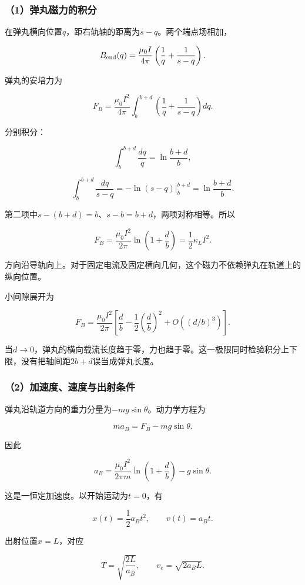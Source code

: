 \documentclass[12pt,a4paper,fontset=fandol]{ctexart}
\begin{document}
\subsubsection{（1）弹丸磁力的积分}\label{ux5f39ux4e38ux78c1ux529bux7684ux79efux5206}

在弹丸横向位置\(q\)，距右轨轴的距离为\(s-q\)。两个端点场相加，

\[
B_{\rm end}(q)=\frac{\mu_0I}{4\pi}
\left(\frac1q+\frac1{s-q}\right).
\]

弹丸的安培力为

\[
F_B=\frac{\mu_0I^2}{4\pi}
\int_b^{b+d}
\left(\frac1q+\frac1{s-q}\right)dq.
\]

分别积分：

\[
\int_b^{b+d}\frac{dq}{q}
=\ln\frac{b+d}{b},
\]

\[
\int_b^{b+d}\frac{dq}{s-q}
=-\ln(s-q)\bigg|_b^{b+d}
=\ln\frac{b+d}{b}.
\]

第二项中\(s-(b+d)=b\)、\(s-b=b+d\)，两项对称相等。所以

\[
\boxed{
F_B=\frac{\mu_0I^2}{2\pi}
\ln\left(1+\frac db\right)
=\frac12\kappa_LI^2}.
\]

方向沿导轨向上。对于固定电流及固定横向几何，这个磁力不依赖弹丸在轨道上的纵向位置。

小间隙展开为

\[
F_B=\frac{\mu_0I^2}{2\pi}
\left[\frac db-\frac12\left(\frac db\right)^2
+O\left((d/b)^3\right)\right].
\]

当\(d\to0\)，弹丸的横向载流长度趋于零，力也趋于零。这一极限同时检验积分上下限，没有把轴间距\(2b+d\)误当成弹丸长度。

\subsubsection{（2）加速度、速度与出射条件}\label{ux52a0ux901fux5ea6ux901fux5ea6ux4e0eux51faux5c04ux6761ux4ef6}

弹丸沿轨道方向的重力分量为\(-mg\sin\theta\)。动力学方程为

\[
ma_B=F_B-mg\sin\theta.
\]

因此

\[
\boxed{
a_B=\frac{\mu_0I^2}{2\pi m}
\ln\left(1+\frac db\right)-g\sin\theta}.
\]

这是一恒定加速度。以开始运动为\(t=0\)，有

\[
x(t)=\frac12a_Bt^2,\qquad v(t)=a_Bt.
\]

出射位置\(x=L\)，对应

\[
\boxed{
T=\sqrt{\frac{2L}{a_B}},
\qquad
v_e=\sqrt{2a_BL}}.
\]
\end{document}

